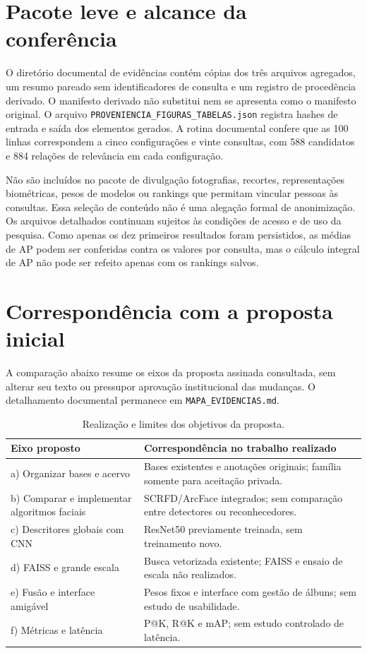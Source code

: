 \section{Pacote leve e alcance da conferência}
O diretório documental de evidências contém cópias dos três arquivos agregados, um resumo pareado sem identificadores de consulta e um registro de procedência derivado. O manifesto derivado não substitui nem se apresenta como o manifesto original. O arquivo \texttt{PROVENIENCIA\_FIGURAS\_TABELAS.json} registra hashes de entrada e saída dos elementos gerados. A rotina documental confere que as 100 linhas correspondem a cinco configurações e vinte consultas, com 588 candidatos e 884 relações de relevância em cada configuração.

Não são incluídos no pacote de divulgação fotografias, recortes, representações biométricas, pesos de modelos ou rankings que permitam vincular pessoas às consultas. Essa seleção de conteúdo não é uma alegação formal de anonimização. Os arquivos detalhados continuam sujeitos às condições de acesso e de uso da pesquisa. Como apenas os dez primeiros resultados foram persistidos, as médias de AP podem ser conferidas contra os valores por consulta, mas o cálculo integral de AP não pode ser refeito apenas com os rankings salvos.

\section{Correspondência com a proposta inicial}
A comparação abaixo resume os eixos da proposta assinada consultada, sem alterar seu texto ou pressupor aprovação institucional das mudanças. O detalhamento documental permanece em \texttt{MAPA\_EVIDENCIAS.md}.

\begin{table}[htbp]
\centering\small\caption{Realização e limites dos objetivos da proposta.}
\begin{tabularx}{\textwidth}{p{}X}\toprule
Eixo proposto & Correspondência no trabalho realizado\\\midrule
a) Organizar bases e acervo & Bases existentes e anotações originais; família somente para aceitação privada.\\
b) Comparar e implementar algoritmos faciais & SCRFD/ArcFace integrados; sem comparação entre detectores ou reconhecedores.\\
c) Descritores globais com CNN & ResNet50 previamente treinada, sem treinamento novo.\\
d) FAISS e grande escala & Busca vetorizada existente; FAISS e ensaio de escala não realizados.\\
e) Fusão e interface amigável & Pesos fixos e interface com gestão de álbuns; sem estudo de usabilidade.\\
f) Métricas e latência & P@K, R@K e mAP; sem estudo controlado de latência.\\\bottomrule
\end{tabularx}
\end{table}
